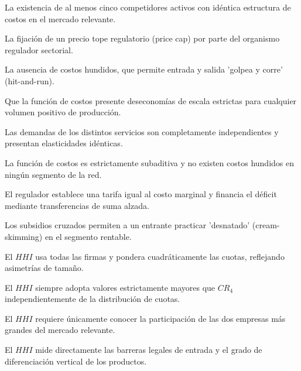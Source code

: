\begin{opts}
    \item La existencia de al menos cinco competidores activos con idéntica estructura de costos en el mercado relevante.
    \item La fijación de un precio tope regulatorio (price cap) por parte del organismo regulador sectorial.
    \item La ausencia de costos hundidos, que permite entrada y salida 'golpea y corre' (hit-and-run).
    \item Que la función de costos presente deseconomías de escala estrictas para cualquier volumen positivo de producción.
\end{opts}

\begin{opts}
    \item Las demandas de los distintos servicios son completamente independientes y presentan elasticidades idénticas.
    \item La función de costos es estrictamente subaditiva y no existen costos hundidos en ningún segmento de la red.
    \item El regulador establece una tarifa igual al costo marginal y financia el déficit mediante transferencias de suma alzada.
    \item Los subsidios cruzados permiten a un entrante practicar 'desnatado' (cream-skimming) en el segmento rentable.
\end{opts}

\begin{opts}
    \item El $HHI$ usa todas las firmas y pondera cuadráticamente las cuotas, reflejando asimetrías de tamaño.
    \item El $HHI$ siempre adopta valores estrictamente mayores que $CR_4$ independientemente de la distribución de cuotas.
    \item El $HHI$ requiere únicamente conocer la participación de las dos empresas más grandes del mercado relevante.
    \item El $HHI$ mide directamente las barreras legales de entrada y el grado de diferenciación vertical de los productos.
\end{opts}

